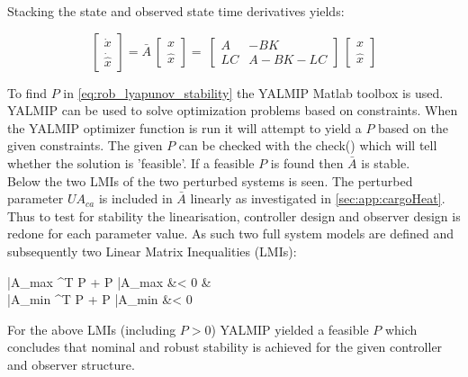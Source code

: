 \noindent Stacking the state and observed state time derivatives yields:

\begin{equation} \label{eq:rob_stacked_sys}
	\begin{bmatrix}
		\dot{x} \\ \dot{\hat{x}}
	\end{bmatrix} = \bar{A}\
	\begin{bmatrix}
	x \\ \hat{x}
	\end{bmatrix} = \
	\begin{bmatrix}
		A & -BK \\ LC & A-BK-LC
	\end{bmatrix} \
	\begin{bmatrix}
		x \\ \hat{x}
	\end{bmatrix}
\end{equation}

\noindent To find $P$ in \cref{eq:rob_lyapunov_stability} the YALMIP Matlab toolbox is used. YALMIP can be used to solve optimization problems based on constraints. When the YALMIP optimizer function is run it will attempt to yield a $P$ based on the given constraints. The given $P$ can be checked with the check() which will tell whether the solution is 'feasible'. If a feasible $P$ is found then $\bar{A}$ is stable.\\

Below the two LMIs of the two perturbed systems is seen. The perturbed parameter $U A_{ca}$ is included in $\bar{A}$ linearly as investigated in \cref{sec:app:cargoHeat}. Thus to test for stability the linearisation, controller design and observer design is redone for each parameter value. As such two full system models are defined and subsequently two Linear Matrix Inequalities (LMIs):

\begin{flalign}
	\hspace{1cm} \bar{A}_{\Delta max} \! ^T \: P + P \:\bar{A}_{\Delta max} &< 0 \text{, $\;$ (+20\% perturbation on $U A_{ca}$)} &\\
	\hspace{1cm} \bar{A}_{\Delta min} \! ^T \: P + P \:\bar{A}_{\Delta min} &< 0 
\end{flalign}

\noindent For the above LMIs (including $P > 0$) YALMIP yielded a feasible $P$ which concludes that nominal and robust stability is achieved for the given controller and observer structure.

